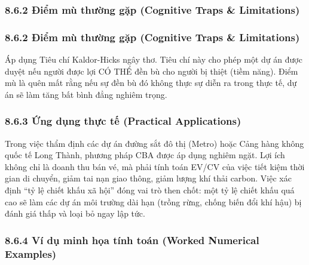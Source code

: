 \documentclass[
]{article}
\begin{document}
\subsubsection{8.6.2 Điểm mù thường gặp (Cognitive Traps \&
Limitations)}\label{ux111iux1ec3m-muxf9-thux1b0ux1eddng-gux1eb7p-cognitive-traps-limitations-64}

\subsubsection{8.6.2 Điểm mù thường gặp (Cognitive Traps \&
Limitations)}\label{ux111iux1ec3m-muxf9-thux1b0ux1eddng-gux1eb7p-cognitive-traps-limitations-65}

Áp dụng Tiêu chí Kaldor-Hicks ngây thơ. Tiêu chí này cho phép một dự án
được duyệt nếu người được lợi CÓ THỂ đền bù cho người bị thiệt (tiềm
năng). Điểm mù là quên mất rằng nếu sự đền bù đó không thực sự diễn ra
trong thực tế, dự án sẽ làm tăng bất bình đẳng nghiêm trọng.

\subsubsection{8.6.3 Ứng dụng thực tế (Practical
Applications)}\label{ux1ee9ng-dux1ee5ng-thux1ef1c-tux1ebf-practical-applications-31}

Trong việc thẩm định các dự án đường sắt đô thị (Metro) hoặc Cảng hàng
không quốc tế Long Thành, phương pháp CBA được áp dụng nghiêm ngặt. Lợi
ích không chỉ là doanh thu bán vé, mà phải tính toán EV/CV của việc tiết
kiệm thời gian di chuyển, giảm tai nạn giao thông, giảm lượng khí thải
carbon. Việc xác định ``tỷ lệ chiết khấu xã hội'' đóng vai trò then
chốt: một tỷ lệ chiết khấu quá cao sẽ làm các dự án môi trường dài hạn
(trồng rừng, chống biến đổi khí hậu) bị đánh giá thấp và loại bỏ ngay
lập tức.

\subsubsection{8.6.4 Ví dụ minh họa tính toán (Worked Numerical
Examples)}\label{vuxed-dux1ee5-minh-hux1ecda-tuxednh-touxe1n-worked-numerical-examples-30}
\end{document}
